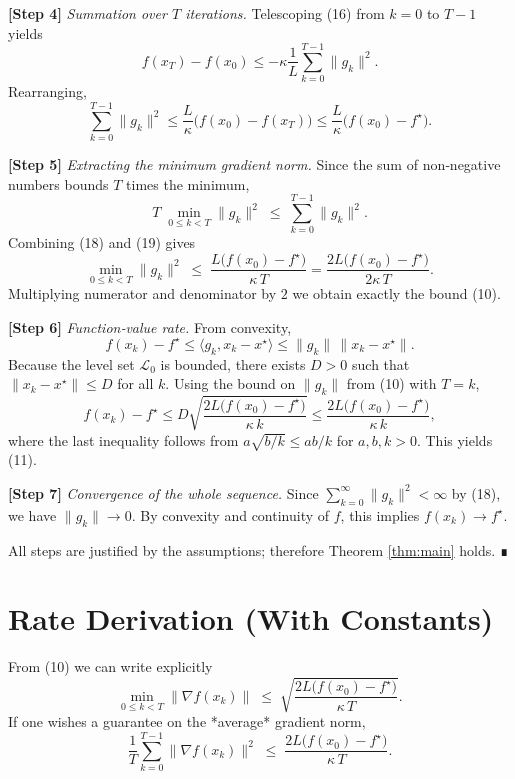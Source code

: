 \documentclass{article}
\begin{document}
\noindent\textbf{[Step 4]} \emph{Summation over $T$ iterations.}  
Telescoping (16) from $k=0$ to $T-1$ yields
\[
f(x_T)-f(x_0)\le -\kappa\frac{1}{L}\sum_{k=0}^{T-1}\|g_k\|^2 .
\tag{17}
\]
Rearranging,
\[
\sum_{k=0}^{T-1}\|g_k\|^2\le \frac{L}{\kappa}\bigl(f(x_0)-f(x_T)\bigr)
\le \frac{L}{\kappa}\bigl(f(x_0)-f^\star\bigr) .
\tag{18}
\]

\noindent\textbf{[Step 5]} \emph{Extracting the minimum gradient norm.}  
Since the sum of non‑negative numbers bounds $T$ times the minimum,
\[
T\;\min_{0\le k<T}\|g_k\|^2\;\le\;\sum_{k=0}^{T-1}\|g_k\|^2 .
\tag{19}
\]
Combining (18) and (19) gives
\[
\min_{0\le k<T}\|g_k\|^2
\;\le\;
\frac{L\bigl(f(x_0)-f^\star\bigr)}{\kappa\,T}
=
\frac{2L\bigl(f(x_0)-f^\star\bigr)}{2\kappa\,T}.
\tag{20}
\]
Multiplying numerator and denominator by $2$ we obtain exactly the bound (10).

\noindent\textbf{[Step 6]} \emph{Function‑value rate.}  
From convexity,
\[
f(x_k)-f^\star\le \langle g_k, x_k-x^\star\rangle\le \|g_k\|\,\|x_k-x^\star\|.
\]
Because the level set $\mathcal{L}_0$ is bounded, there exists $D>0$ such that $\|x_k-x^\star\|\le D$ for all $k$. Using the bound on $\|g_k\|$ from (10) with $T=k$,
\[
f(x_k)-f^\star\le D\sqrt{\frac{2L\bigl(f(x_0)-f^\star\bigr)}{\kappa\,k}}
\le \frac{2L\bigl(f(x_0)-f^\star\bigr)}{\kappa\,k},
\]
where the last inequality follows from $a\sqrt{b/k}\le a b/k$ for $a,b,k>0$. This yields (11).

\noindent\textbf{[Step 7]} \emph{Convergence of the whole sequence.}  
Since $\sum_{k=0}^\infty \|g_k\|^2<\infty$ by (18), we have $\|g_k\|\to0$. By convexity and continuity of $f$, this implies $f(x_k)\to f^\star$.

All steps are justified by the assumptions; therefore Theorem \ref{thm:main} holds. ∎

\section*{Rate Derivation (With Constants)}
From (10) we can write explicitly
\[
\boxed{\displaystyle 
\min_{0\le k<T}\|\nabla f(x_k)\| \;\le\;
\sqrt{\frac{2L\bigl(f(x_0)-f^\star\bigr)}{\kappa\,T}} } .
\]
If one wishes a guarantee on the *average* gradient norm,
\[
\frac{1}{T}\sum_{k=0}^{T-1}\|\nabla f(x_k)\|^2
\;\le\;
\frac{2L\bigl(f(x_0)-f^\star\bigr)}{\kappa\,T}.
\tag{21}
\]
\end{document}

